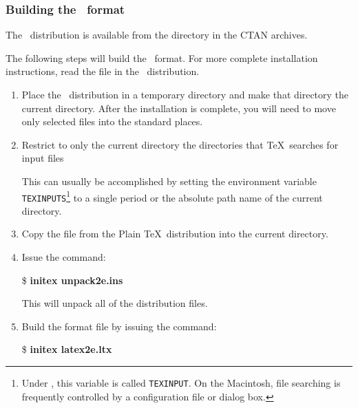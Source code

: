 
\subsubsection{Building the \protect\LaTeXe\ format}
\label{sec:buildlatexe}

The \LaTeXe\ distribution is available from the directory
 in the CTAN 
archives.

The following steps will build the \LaTeXe\ format. For more complete
installation instructions, read the file  in the 
\LaTeXe\ distribution.

\begin{enumerate}
  \item Place the \LaTeXe\ distribution in a temporary directory and make that
    directory the current directory.  After the installation is complete, you
    will need to move only selected files into the standard places.

\item Restrict to only the current directory the directories that \TeX\
  searches for input files

  This can usually be accomplished by setting the environment variable
  \texttt{TEXINPUTS}\footnote{Under \emTeX, this variable is called
  \texttt{TEXINPUT}.  On the Macintosh, file searching is frequently
  controlled by a configuration file or dialog box.}  to a single period or
  the absolute path name of the current directory.

\item Copy the  file  from the Plain \TeX\ distribution
  into the current directory.

\item Issue the command:

\begin{ttindent}
\$ \textbf{initex unpack2e.ins}
\end{ttindent}

  This will unpack all of the distribution files.

  \item Build the format file by issuing the command:

\begin{ttindent}
\$ \textbf{initex latex2e.ltx}
\end{ttindent}


\end{enumerate}
